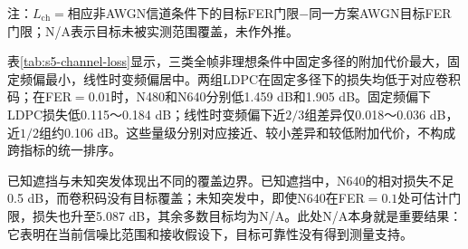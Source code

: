\begin{table}[htbp]
  \centering\scriptsize
  \caption{相对各方案自身AWGN基线的信道损失}
  \label{tab:s5-channel-loss}
  \vspace{0.3em}\par\footnotesize 注：$L_{\mathrm{ch}}=$相应非AWGN信道条件下的目标FER门限$-$同一方案AWGN目标FER门限；N/A表示目标未被实测范围覆盖，未作外推。
\end{table}

表\ref{tab:s5-channel-loss}显示，三类全帧非理想条件中固定多径的附加代价最大，固定频偏最小，线性时变频偏居中。两组LDPC在固定多径下的损失均低于对应卷积码；在FER$=0.01$时，N480和N640分别低1.459 dB和1.905 dB。固定频偏下LDPC损失低0.115～0.184 dB；线性时变频偏下近$2/3$组差异仅0.018～0.036 dB，近$1/2$组约0.106 dB。这些量级分别对应接近、较小差异和较低附加代价，不构成跨指标的统一排序。

已知遮挡与未知突发体现出不同的覆盖边界。已知遮挡中，N640的相对损失不足0.5 dB，而卷积码没有目标覆盖；未知突发中，即使N640在FER$=0.1$处可估计门限，损失也升至5.087 dB，其余多数目标均为N/A。此处N/A本身就是重要结果：它表明在当前信噪比范围和接收假设下，目标可靠性没有得到测量支持。

